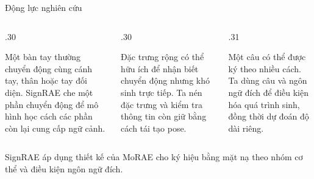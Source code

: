 \newcommand{\motionflowarrow}[2]{\draw[stagearrow] (#1.east) -- (#2.west);}
\newcommand{\methodpoint}[2]{\par\textbf{#1}\enspace #2\par}

\begin{frame}{Động lực nghiên cứu}
  \vspace{.20cm}
  \begin{columns}[T,onlytextwidth]
    \begin{column}{.30\textwidth}
      \par\medskip
      Một bàn tay thường chuyển động cùng cánh tay, thân hoặc tay đối diện. SignRAE che một phần chuyển động để mô hình học cách các phần còn lại cung cấp ngữ cảnh.
    \end{column}
    \begin{column}{.30\textwidth}
      \par\medskip
      Đặc trưng rộng có thể hữu ích để nhận biết chuyển động nhưng khó sinh trực tiếp. Ta nén đặc trưng và kiểm tra thông tin còn giữ bằng cách tái tạo pose.
    \end{column}
    \begin{column}{.31\textwidth}
      \par\medskip
      Một câu có thể được ký theo nhiều cách. Ta dùng câu và ngôn ngữ đích để điều kiện hóa quá trình sinh, đồng thời dự đoán độ dài riêng.
    \end{column}
  \end{columns}
  \vspace{.42cm}
  \small SignRAE áp dụng thiết kế của MoRAE cho ký hiệu bằng mặt nạ theo nhóm cơ thể và điều kiện ngôn ngữ đích.
  \par\smallskip
\end{frame}

